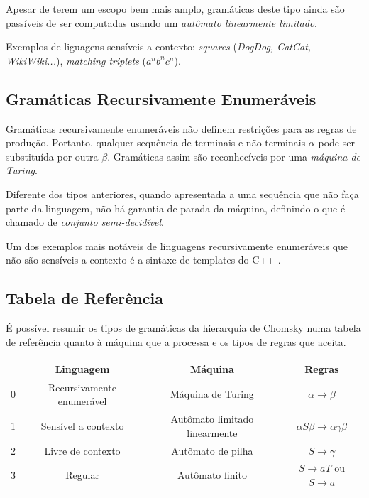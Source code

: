 \documentclass[a4paper,12pt,oneside,onecolumn]{uerj}
\begin{document}
Apesar de terem um escopo bem mais amplo, gramáticas deste tipo ainda são passíveis de ser computadas usando um \emph{autômato linearmente limitado}. 

Exemplos de liguagens sensíveis a contexto: \emph{squares} (\emph{DogDog, CatCat, WikiWiki...}), \emph{matching triplets} ($a^nb^nc^n$).

\subsection{Gramáticas Recursivamente Enumeráveis}

Gramáticas recursivamente enumeráveis não definem restrições para as regras de produção. Portanto, qualquer sequência de terminais e não-terminais $\alpha$ pode ser substituída por outra $\beta$. Gramáticas assim são reconhecíveis por uma \emph{máquina de Turing}. 

Diferente dos tipos anteriores, quando apresentada a uma sequência que não faça parte da linguagem, não há garantia de parada da máquina, definindo o que é chamado de \emph{conjunto semi-decidível}.

Um dos exemplos mais notáveis de linguagens recursivamente enumeráveis que não são sensíveis a contexto é a sintaxe de templates do C++ \cite{bib:Veldhuizen03}.

\subsection{Tabela de Referência}

É possível resumir os tipos de gramáticas da hierarquia de Chomsky numa tabela de referência quanto à máquina que a processa e os tipos de regras que aceita.

\begin{center}
	\begin{tabular}{ c | c | c | c }
		 & {\bf Linguagem} & {\bf Máquina} & {\bf Regras} \\
		\hline 
		0 & Recursivamente enumerável & Máquina de Turing 			 & 
			$\alpha \rightarrow \beta$ \\ 
		1 & Sensível a contexto 		& Autômato limitado linearmente & 
			$\alpha S\beta\rightarrow \alpha\gamma\beta$\\ 
		2 & Livre de contexto 			& Autômato de pilha 			 & 
			$S \rightarrow \gamma$\\ 
		3 & Regular 					& Autômato finito 				 &
			$S \rightarrow aT$ ou $S \rightarrow a$\\ 
	\end{tabular}
\end{center}
\end{document}
